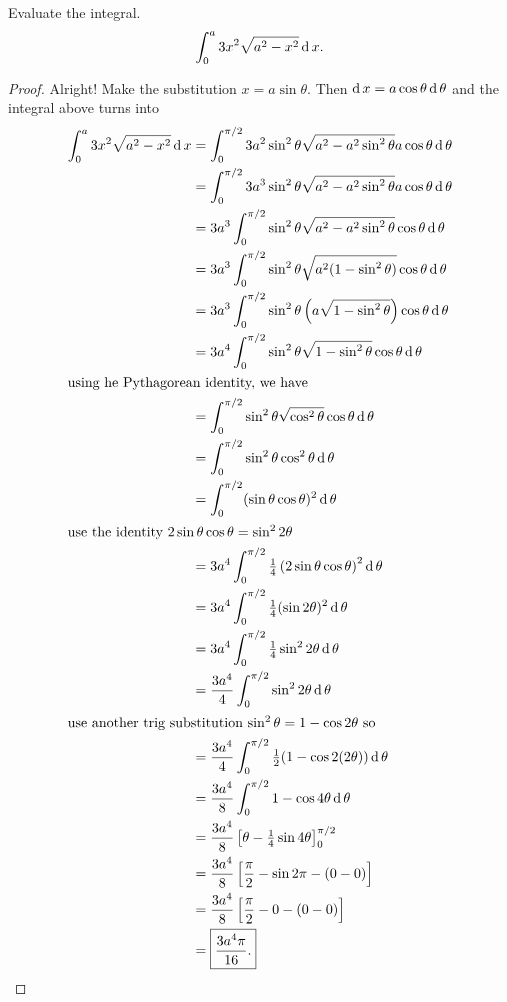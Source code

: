 \begin{problem}[WebAssign, HW 11, \#4]
Evaluate the integral.
\[
\int_0^a 3x^2\sqrt{a^2-x^2}\operatorname{d} x.
\]
\end{problem}
\begin{proof}
Alright! Make the substitution $x=a\sin\theta$. Then $\operatorname{d}
x=a\cos\theta\operatorname{d}\theta$ and the integral above turns into
\begingroup
\allowdisplaybreaks
\begin{align*}
\int_0^a 3x^2\sqrt{a^2-x^2}\operatorname{d} x
&=\int_0^{\pi/2}3a^2\sin^2\theta\sqrt{a^2-a^2\sin^2\theta}a\cos\theta\operatorname{d}\theta\\
&=\int_0^{\pi/2}3a^3\sin^2\theta\sqrt{a^2-a^2\sin^2\theta}a\cos\theta\operatorname{d}\theta\\
&=3a^3\int_0^{\pi/2}\sin^2\theta\sqrt{a^2-a^2\sin^2\theta}\cos\theta\operatorname{d}\theta\\
&=3a^3\int_0^{\pi/2}\sin^2\theta\sqrt{a^2(1-\sin^2\theta)}\cos\theta\operatorname{d}\theta\\
&=3a^3\int_0^{\pi/2}\sin^2\theta\left(a\sqrt{1-\sin^2\theta}\right)\cos\theta\operatorname{d}\theta\\
&=3a^4\int_0^{\pi/2}\sin^2\theta\sqrt{1-\sin^2\theta}\cos\theta\operatorname{d}\theta\\
\intertext{using he Pythagorean identity, we have}
&=\int_0^{\pi/2}\sin^2\theta\sqrt{\cos^2\theta}\cos\theta\operatorname{d}\theta\\
&=\int_0^{\pi/2}\sin^2\theta\cos^2\theta\operatorname{d}\theta\\
&=\int_0^{\pi/2}(\sin\theta\cos\theta)^2\operatorname{d}\theta\\
\intertext{use the identity $2\sin\theta\cos\theta=\sin^22\theta$}
&=3a^4\int_0^{\pi/2}\tfrac{1}{4}\left(2\sin\theta\cos\theta\right)^2\operatorname{d}\theta\\
&=3a^4\int_0^{\pi/2}\tfrac{1}{4}(\sin 2\theta)^2\operatorname{d}\theta\\
&=3a^4\int_0^{\pi/2}\tfrac{1}{4}\sin^2 2\theta\operatorname{d}\theta\\
&=\frac{3a^4}{4}\int_0^{\pi/2}\sin^2 2\theta\operatorname{d}\theta\\
\intertext{use another trig substitution $\sin^2\theta=1-\cos 2\theta$ so}
&=\frac{3a^4}{4}\int_0^{\pi/2}\tfrac{1}{2}(1-\cos 2(2\theta))\operatorname{d}\theta\\
&=\frac{3a^4}{8}\int_0^{\pi/2}1-\cos 4\theta\operatorname{d}\theta\\
&=\frac{3a^4}{8}\left[\theta-\tfrac{1}{4}\sin 4\theta\right]_0^{\pi/2}\\
&=\frac{3a^4}{8}\left[\frac{\pi}{2}-\sin 2\pi-(0-0)\right]\\
&=\frac{3a^4}{8}\left[\frac{\pi}{2}-0-(0-0)\right]\\
&=\boxed{\frac{3a^4\pi}{16}.}
\end{align*}
\endgroup
\end{proof}

